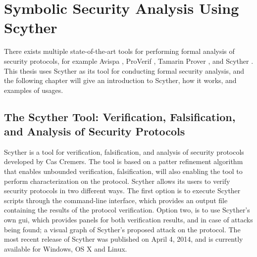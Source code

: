 \chapter{Symbolic Security Analysis Using Scyther}
\label{chp:scyther} 


There exists multiple state-of-the-art tools for performing formal analysis of security protocols, for example Avispa \cite{avispa}, ProVerif \cite{proverif}, Tamarin Prover \cite{meier2013tamarin}, and Scyther \cite{scyther}. This thesis uses Scyther as its tool for conducting formal security analysis, and the following chapter will give an introduction to Scyther, how it works, and examples of usages.


\section{The Scyther Tool: Verification, Falsification, and Analysis of Security Protocols}

Scyther is a tool for verification, falsification, and analysis of security protocols developed by Cas Cremers. The tool is based on a patter refinement algorithm that enables unbounded verification, falsification, will also enabling the tool to perform characterization \cite{cremers2008scyther} on the protocol. Scyther allows its users to verify security protocols in two different ways. The first option is to execute Scyther scripts through the command-line interface, which provides an output file containing the results of the protocol verification. Option two, is to use Scyther's own \gls{gui}, which provides panels for both verification results, and in case of attacks being found; a visual graph of Scyther's proposed attack on the protocol. The most recent release of Scyther was published on April 4, 2014, and is currently available for Windows, OS X and Linux.


